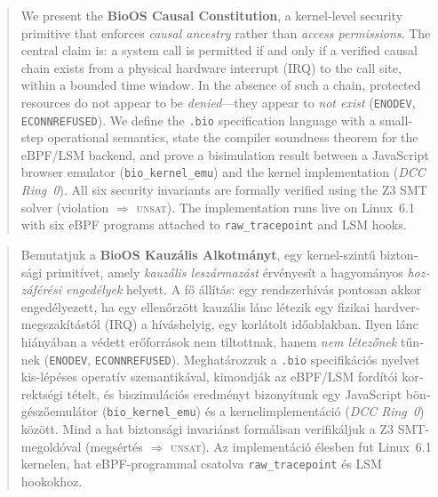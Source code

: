 \documentclass[11pt,a4paper,twoside]{article}
\begin{document}
\begin{abstract}
We present the \textbf{BioOS Causal Constitution}, a kernel-level security
primitive that enforces \emph{causal ancestry} rather than \emph{access permissions}.
The central claim is: a system call is permitted if and only if a verified causal
chain exists from a physical hardware interrupt (IRQ) to the call site, within a
bounded time window. In the absence of such a chain, protected resources do not
appear to be \emph{denied}---they appear to \emph{not exist}
(\texttt{ENODEV}, \texttt{ECONNREFUSED}).
We define the \texttt{.bio} specification language with a small-step operational
semantics, state the compiler soundness theorem for the eBPF/LSM backend, and
prove a bisimulation result between a JavaScript browser emulator
(\texttt{bio\_kernel\_emu}) and the kernel implementation (\textit{DCC Ring~0}).
All six security invariants are formally verified using the Z3 SMT solver
(violation $\Rightarrow$ \textsc{unsat}).
The implementation runs live on Linux~6.1 with six eBPF programs attached to
\texttt{raw\_tracepoint} and LSM hooks.
\end{abstract}

\vspace{6pt}
\begin{magyar}
\begin{abstract}
Bemutatjuk a \textbf{BioOS Kauzális Alkotmányt}, egy kernel-szintű biztonsági
primitívet, amely \emph{kauzális leszármazást} érvényesít a hagyományos
\emph{hozzáférési engedélyek} helyett. A fő állítás: egy rendszerhívás pontosan
akkor engedélyezett, ha egy ellenőrzött kauzális lánc létezik egy fizikai
hardvermegszakítástól (IRQ) a híváshelyig, egy korlátolt időablakban. Ilyen
lánc hiányában a védett erőforrások nem tiltottnak, hanem \emph{nem létezőnek}
tűnnek (\texttt{ENODEV}, \texttt{ECONNREFUSED}). Meghatározzuk a \texttt{.bio}
specifikációs nyelvet kis-lépéses operatív szemantikával, kimondják az eBPF/LSM
fordítói korrektségi tételt, és biszimulációs eredményt bizonyítunk egy JavaScript
böngészőemulátor (\texttt{bio\_kernel\_emu}) és a kernelimplementáció
(\textit{DCC Ring~0}) között. Mind a hat biztonsági invariánst formálisan
verifikáljuk a Z3 SMT-megoldóval (megsértés $\Rightarrow$ \textsc{unsat}).
Az implementáció élesben fut Linux~6.1 kernelen, hat eBPF-programmal csatolva
\texttt{raw\_tracepoint} és LSM hookokhoz.
\end{abstract}
\end{magyar}
\end{document}
